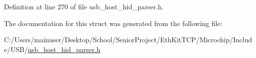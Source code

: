 Definition at line 270 of file usb\+\_\+host\+\_\+hid\+\_\+parser.\+h.



The documentation for this struct was generated from the following file\+:\begin{DoxyCompactItemize}
\item 
C\+:/\+Users/mainuser/\+Desktop/\+School/\+Senior\+Project/\+Eth\+Kit\+T\+C\+P/\+Microchip/\+Include/\+U\+S\+B/\hyperlink{usb__host__hid__parser_8h}{usb\+\_\+host\+\_\+hid\+\_\+parser.\+h}\end{DoxyCompactItemize}
